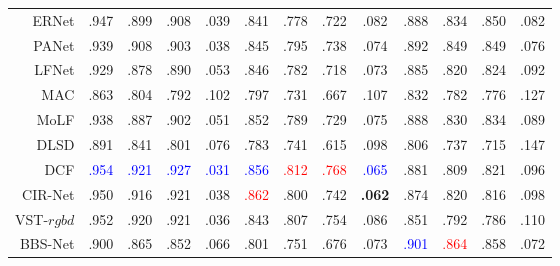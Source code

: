 \begin{table}[!ht]
{\begin{tabular}{rcccccccccccc}
			ERNet \cite{piao2020exploit}
			& .947 & .899 & .908 & .039 
			&	.841 &	.778 &	.722 &	.082 
			&	.888 &	.834 &	.850 &	.082 
			\\
			
			PANet \cite{piao2021panet} 
			& .939 & .908 & .903 & .038 
			& .845 & .795 & .738 & .074 
			& .892 & .849 & .849 & .076
			\\
			
			LFNet	 \cite{zhang2020lfnet} 
			& .929 & .878 & .890 & .053
			&	.846 &	.782 &	.718 &	.073 
			&	.885 &	.820 &	.824 &	.092 \\
			
			MAC	 \cite{zhang2020light} 
			& .863	& .804	& .792	& .102	
			&   .797 & .731 & .667 & .107 
			& .832 & .782 & .776 & .127 \\
			
			MoLF	 \cite{zhang2019memory} 
			& .938 & .887 & .902 & .051 
			&	.852 &	.789 &	.729 &	.075 
			&	.888 &	.830 &	.834 &	.089 \\
			
			DLSD	\cite{piao2019deep}
			& .891	& .841	& .801	& .076	
			&   .783 & .741 & .615 & .098 
			& .806 & .737 & .715 & .147 \\
			
			\midrule[1pt] %
			
			
			DCF \cite{ji2021calibrated} 
			& \textcolor{blue}{.954} & \textcolor{blue}{.921} & \textcolor{blue}{.927} & \textcolor{blue}{.031} 
			& \textcolor{blue}{.856} & {\textcolor{red}{.812}} & {\textcolor{red}{.768}} & \textcolor{blue}{.065} 
			& .881 & .809 & .821 & .096 \\
			
			CIR-Net \cite{cong2022cir}
			& .950 & .916 & .921 & .038 
			& {\textcolor{red}{.862}} & .800  			& .742 & \textbf{ {.062}} 
			& .874 & .820 & .816 & .098 \\ 
			
			VST-$rgbd$  \cite{liu2021visual} 
			& .952 & .920 & .921 & .036 
			& .843 & .807 & .754 & .086 
			& .851 & .792 & .786 & .110 
			\\
			
			
			BBS-Net     \cite{fan2020bbs} 
			& .900 & .865 & .852 & .066 
			& .801 & .751 & .676 & .073 
			& \textcolor{blue}{.901} & {\textcolor{red}{.864}} & .858 & .072 \\ 
			

\end{tabular}}
\end{table}
